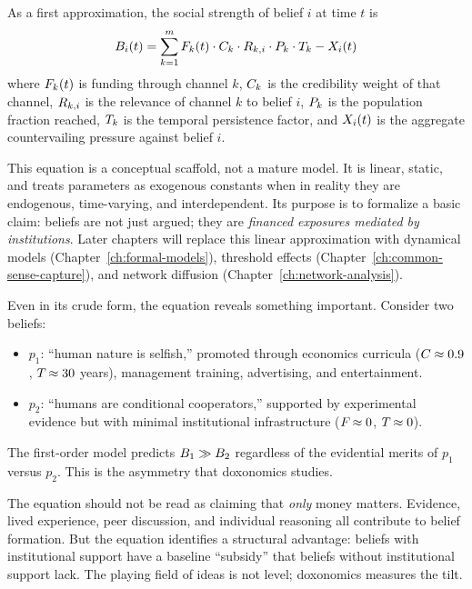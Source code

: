 \begin{model}
\label{mod:first-order}
As a first approximation, the social strength of belief $i$ at time $t$ is
\begin{equation}
\label{eq:first-order}
  B_{i}(t) = \sum_{k=1}^{m} F_{k}(t) \cdot C_{k} \cdot R_{k,i} \cdot P_{k} \cdot T_{k} - X_{i}(t)
\end{equation}
where $F_{k}(t)$ is funding through channel $k$, $C_{k}$ is the credibility weight of that channel, $R_{k,i}$ is the relevance of channel $k$ to belief $i$, $P_{k}$ is the population fraction reached, $T_{k}$ is the temporal persistence factor, and $X_{i}(t)$ is the aggregate countervailing pressure against belief $i$.
\end{model}

This equation is a conceptual scaffold, not a mature model.
It is linear, static, and treats parameters as exogenous constants when in reality they are endogenous, time-varying, and interdependent.
Its purpose is to formalize a basic claim: beliefs are not just argued; they are \emph{financed exposures mediated by institutions}.
Later chapters will replace this linear approximation with dynamical models (Chapter~\ref{ch:formal-models}), threshold effects (Chapter~\ref{ch:common-sense-capture}), and network diffusion (Chapter~\ref{ch:network-analysis}).

Even in its crude form, the equation reveals something important.
Consider two beliefs:
\begin{itemize}[nosep]
  \item $p_1$: ``human nature is selfish,'' promoted through economics curricula ($C_{} \approx 0.9$, $T_{} \approx 30$ years), management training, advertising, and entertainment.
  \item $p_2$: ``humans are conditional cooperators,'' supported by experimental evidence but with minimal institutional infrastructure ($F_{} \approx 0$, $T_{} \approx 0$).
\end{itemize}
The first-order model predicts $B_{1} \gg B_{2}$ regardless of the evidential merits of $p_1$ versus $p_2$.
This is the asymmetry that doxonomics studies.

\begin{remark}
The equation should not be read as claiming that \emph{only} money matters.
Evidence, lived experience, peer discussion, and individual reasoning all contribute to belief formation.
But the equation identifies a structural advantage: beliefs with institutional support have a baseline ``subsidy'' that beliefs without institutional support lack.
The playing field of ideas is not level; doxonomics measures the tilt.
\end{remark}


